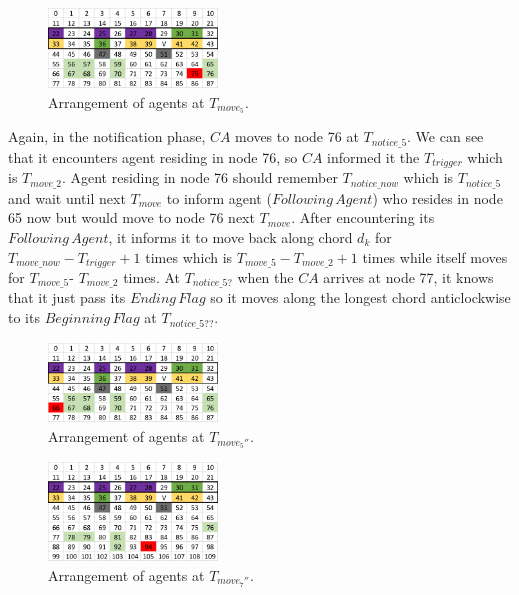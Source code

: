 \documentclass[conference]{IEEEtran}
\begin{document}
\begin{figure}[H]
  \centering  
  \includegraphics[width=0.4\textwidth]{figures/T75.png}
  \caption{Arrangement of agents at $T_{move_5}$. }\label{fig:T75}
\end{figure}
Again, in the notification phase, $CA$ moves to node 76 at $T_{notice\_5}$. We can see that it encounters agent residing in node 76, so $CA$ informed it the $T_{trigger}$ which is $T_{move\_2}$. Agent residing in node 76 should remember $T_{notice\_now}$ which is $T_{notice\_5}$ and wait until next $T_{move}$ to inform agent ($Following\,Agent$) who resides in node 65 now but would move to node 76 next $T_{move}$. After encountering its $Following\,Agent$, it informs it to move back along chord $d_k$ for $T_{move\_now}-T_{trigger} +1$ times which is $T_{move\_5}- T_{move\_2}+1$ times while itself moves for $T_{move\_5}$- $T_{move\_2}$ times. 
At $T_{notice\_5?}$ when the $CA$ arrives at node 77, it knows that it just pass its $Ending\,Flag$ so it moves along the longest chord anticlockwise to its $Beginning\,Flag$ at $T_{notice\_5??}$.
\begin{figure}[H]
  \centering  
  \includegraphics[width=0.4\textwidth]{figures/T66.png}
  \caption{Arrangement of agents at $T_{move_5''}$. }\label{fig:T66}
\end{figure}

\begin{figure}[H]
  \centering  
  \includegraphics[width=0.4\textwidth]{figures/T94.png}
  \caption{Arrangement of agents at $T_{move_7''}$. }\label{fig:T94}
\end{figure}
\end{document}
